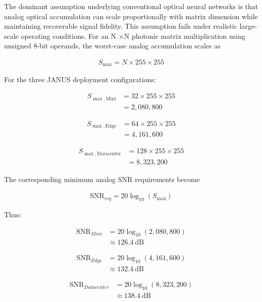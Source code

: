 \documentclass[journal]{IEEEtran}
\begin{document}
The dominant assumption underlying conventional optical neural networks is that analog optical accumulation can scale proportionally with matrix dimension while maintaining recoverable signal fidelity. This assumption fails under realistic large-scale operating conditions.
For an N $\times$N photonic matrix multiplication using unsigned 8-bit operands, the worst-case analog accumulation scales as

\begin{align}
S_{\max} = N \times 255 \times 255
\label{eq:general_accumulation}
\end{align}

For the three JANUS deployment configurations:

\begin{align}
S_{\max,\mathrm{Mini}} &= 32 \times 255 \times 255 \\
&= 2{,}080{,}800
\end{align}

\begin{align}
S_{\max,\mathrm{Edge}} &= 64 \times 255 \times 255 \\
&= 4{,}161{,}600
\end{align}

\begin{align}
S_{\max,\mathrm{Datacenter}} &= 128 \times 255 \times 255 \\
&= 8{,}323{,}200
\end{align}

The corresponding minimum analog SNR requirements become

\begin{align}
\mathrm{SNR}_{req} = 20\log_{10}\left(S_{\max}\right)
\label{eq:general_snr}
\end{align}

Thus:

\begin{align}
\mathrm{SNR}_{Mini} &= 20\log_{10}(2{,}080{,}800) \\
&\approx 126.4~\mathrm{dB}
\end{align}

\begin{align}
\mathrm{SNR}_{Edge} &= 20\log_{10}(4{,}161{,}600) \\
&\approx 132.4~\mathrm{dB}
\end{align}

\begin{align}
\mathrm{SNR}_{Datacenter} &= 20\log_{10}(8{,}323{,}200) \\
&\approx 138.4~\mathrm{dB}
\end{align}
\end{document}
